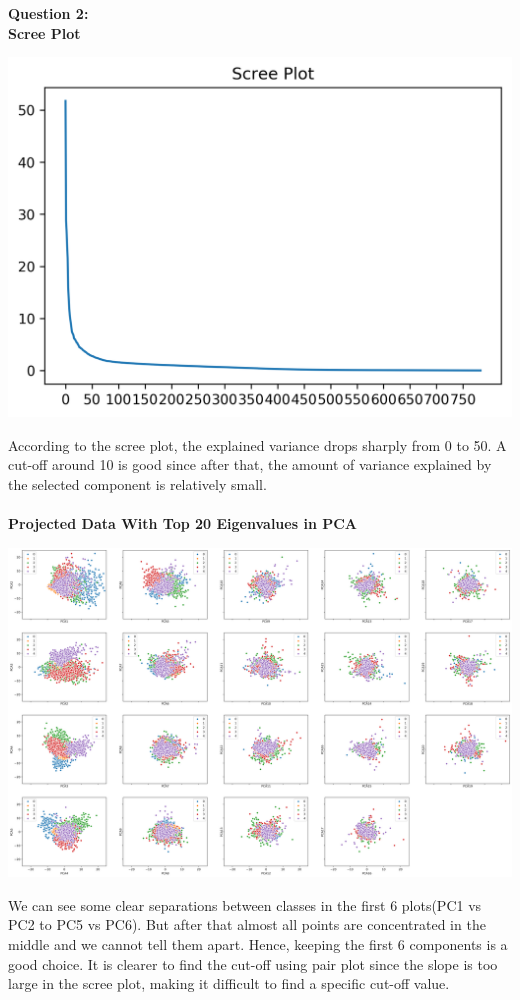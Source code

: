 \documentclass[12pt]{article}
\begin{document}
\noindent
\textbf{\large Question 2:}\\
\textbf{Scree Plot}
\begin{center}
    \includegraphics[width=14cm]{Q2_ScreePlot.png}
\end{center}
\noindent
According to the scree plot, the explained variance drops sharply from 0 to 50. A cut-off around 10 is good since after that, the amount of variance explained by the selected component is relatively small.\\\\
\textbf{Projected Data With Top 20 Eigenvalues in PCA}
\begin{center}
    \includegraphics[width=18cm]{Q2_PCATop19.png}
\end{center}
\noindent
We can see some clear separations between classes in the first 6 plots(PC1 vs PC2 to PC5 vs PC6). But after that almost all points are concentrated in the middle and we cannot tell them apart. Hence, keeping the first 6 components is a good choice. It is clearer to find the cut-off using pair plot since the slope is too large in the scree plot, making it difficult to find a specific cut-off value.\\\\
\end{document}
